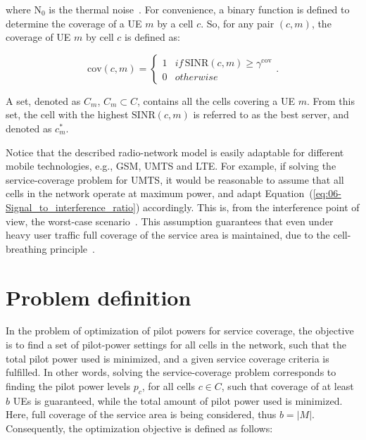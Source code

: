 \noindent where $\mathrm{N}_{0}$
is the thermal noise~\cite{RadioNetworkPlanningAndOptimisationForUMTS}.
For convenience, a binary function is defined to determine the coverage
of a UE $m$ by a cell $c$. So, for any pair $(c,m)$, the coverage
of UE $m$ by cell $c$ is defined as:

\begin{equation}
\mathrm{cov}(c,m)=\begin{cases}
1 & if\,\mathrm{SINR}(c,m)\ge\gamma^{\mathrm{cov}}\\
0 & otherwise
\end{cases}.
\end{equation}


\noindent {}

\noindent A set, denoted as $C_{m}$,
$C_{m}\subset C$, contains all the cells covering a UE $m$. From
this set, the cell with the highest $\mathrm{SINR}(c,m)$ is referred
to as the best server, and denoted as $c_{m}^{*}$.

\noindent Notice that the described radio-network model is easily
adaptable for different mobile technologies, e.g., GSM, UMTS and LTE.
For example, if solving the service-coverage problem for UMTS, it
would be reasonable to assume that all cells in the network operate
at maximum power, and adapt Equation~(\ref{eq:06-Signal_to_interference_ratio})
accordingly. This is, from the interference point of view, the worst-case
scenario~\cite{chen2008automated,Siomina:Minimum.pilot.power.for.service.coverage}.
This assumption guarantees that even under heavy user traffic full
coverage of the service area is maintained, due to the cell-breathing
principle~\cite{WCDMAforUMTS_RadioAccessForThirdGenerationMobileCommunications}.


\section{Problem definition \label{sec:06-Problem-definition}}

In the problem of optimization of pilot powers for service coverage,
the objective is to find a set of pilot-power settings for all cells
in the network, such that the total pilot power used is minimized,
and a given service coverage criteria is fulfilled. In other words,
solving the service-coverage problem corresponds to finding the pilot
power levels $p_{c}$, for all cells $c\in C$, such that coverage
of at least $b$ UEs is guaranteed, while the total amount of pilot
power used is minimized. Here, full coverage of the service area is
being considered, thus $b=\vert M\vert$. Consequently, the optimization
objective is defined as follows:

